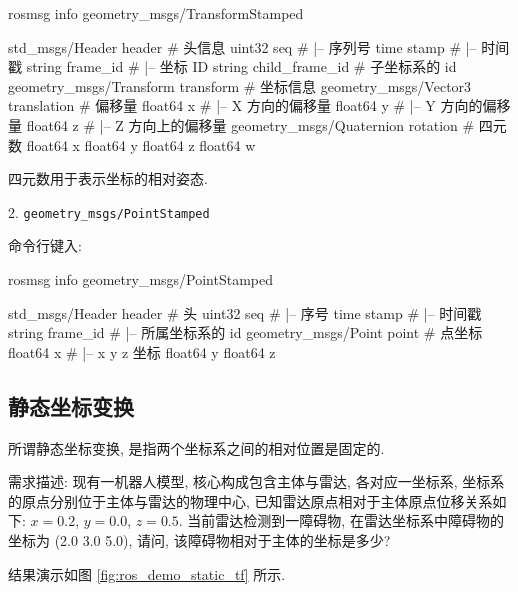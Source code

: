 \documentclass[openany, fontset=windowsold]{ctexbook}
\theoremstyle{kaiti}
\theoremstyle{normal}
\begin{document}
\begin{bash}
  rosmsg info geometry_msgs/TransformStamped

  std_msgs/Header header                     # 头信息
    uint32 seq                                # |-- 序列号
    time stamp                                # |-- 时间戳
    string frame_id                            # |-- 坐标 ID
  string child_frame_id                    # 子坐标系的 id
  geometry_msgs/Transform transform        # 坐标信息
    geometry_msgs/Vector3 translation        # 偏移量
      float64 x                                # |-- X 方向的偏移量
      float64 y                                # |-- Y 方向的偏移量
      float64 z                                # |-- Z 方向上的偏移量
    geometry_msgs/Quaternion rotation        # 四元数
      float64 x                                
      float64 y                                
      float64 z                                
      float64 w
\end{bash}

四元数用于表示坐标的相对姿态.

2. \verb|geometry_msgs/PointStamped|

命令行键入:

\begin{bash}
  rosmsg info geometry_msgs/PointStamped

  std_msgs/Header header                    # 头
    uint32 seq                                # |-- 序号
    time stamp                                # |-- 时间戳
    string frame_id                            # |-- 所属坐标系的 id
  geometry_msgs/Point point                # 点坐标
    float64 x                                    # |-- x y z 坐标
    float64 y
    float64 z
\end{bash}

\subsection{静态坐标变换}

所谓静态坐标变换, 是指两个坐标系之间的相对位置是固定的.

需求描述: 现有一机器人模型, 核心构成包含主体与雷达, 各对应一坐标系, 坐标系的原点分别位于主体与雷达的物理中心, 已知雷达原点相对于主体原点位移关系如下: $x=0.2$, $y=0.0$, $z=0.5$. 当前雷达检测到一障碍物, 在雷达坐标系中障碍物的坐标为 (2.0 3.0 5.0), 请问, 该障碍物相对于主体的坐标是多少? 

结果演示如图 \ref{fig:ros_demo_static_tf} 所示.
\end{document}

